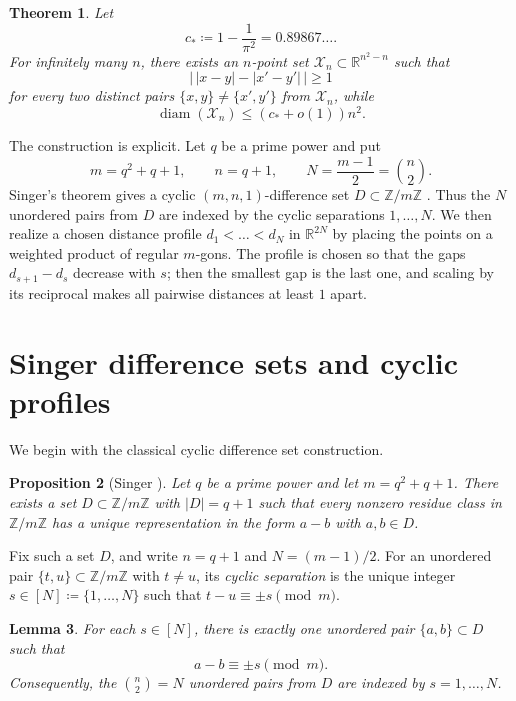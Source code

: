 \documentclass[twoside, reqno, 12pt]{amsart}
\newtheorem{theorem}{Theorem}
\newtheorem{proposition}[theorem]{Proposition}
\newtheorem{lemma}[theorem]{Lemma}
\theoremstyle{definition}
\theoremstyle{remark}
\DeclareMathOperator{\diam}{diam}
\begin{document}
\begin{theorem}\label{thm:main}
Let
\[
 c_*\coloneqq1-\frac{1}{\pi^2}=0.89867\dots.
\]
For infinitely many $n$, there exists an $n$-point set
$\mathcal X_n\subset \mathbb R^{n^2-n}$ such that
\begin{equation}\label{eq:sep-condition}
\bigl|\,|x-y|-|x'-y'|\,\bigr|\ge 1
\end{equation}
for every two distinct pairs
$\{x,y\}\neq \{x',y'\}$ from $\mathcal X_n$, while
\[
\diam(\mathcal X_n)\le (c_*+o(1))n^2.
\]
\end{theorem}

\newpage
The construction is explicit. Let $q$ be a prime power and put
\[
 m=q^2+q+1,
 \qquad n=q+1,
 \qquad N=\frac{m-1}{2}=\binom{n}{2}.
\]
Singer's theorem gives a cyclic $(m,n,1)$-difference set
$D\subset \mathbb Z/m\mathbb Z$ \cite{Singer1938}. Thus the $N$ unordered pairs from $D$
are indexed by the cyclic separations $1,\dots,N$. We then realize a chosen
distance profile $d_1<\dots<d_N$ in $\mathbb R^{2N}$ by placing the points on a
weighted product of regular $m$-gons. The profile is chosen so that the gaps
$d_{s+1}-d_s$ decrease with $s$; then the smallest gap is the last one, and
scaling by its reciprocal makes all pairwise distances at least $1$ apart.

\section{Singer difference sets and cyclic profiles}

We begin with the classical cyclic difference set construction.

\begin{proposition}[Singer \cite{Singer1938}]\label{prop:singer}
Let $q$ be a prime power and let $m=q^2+q+1$. There exists a set
$D\subset \mathbb Z/m\mathbb Z$ with $|D|=q+1$ such that every nonzero residue class in
$\mathbb Z/m\mathbb Z$ has a unique representation in the form $a-b$ with $a,b\in D$.
\end{proposition}

Fix such a set $D$, and write $n=q+1$ and $N=(m-1)/2$. For an unordered pair $\{t,u\}\subset \mathbb Z/m\mathbb Z$ with $t\neq u$, its
\emph{cyclic separation} is the unique integer $s\in[N]\coloneqq\{1,\dots,N\}$ such that
$t-u\equiv \pm s \pmod m$.

\begin{lemma}\label{lem:separations}
For each $s\in[N]$, there is exactly one unordered pair
$\{a,b\}\subset D$ such that
\[
a-b\equiv \pm s \pmod m.
\]
Consequently, the $\binom n2=N$ unordered pairs from $D$ are indexed by
$s=1,\dots,N$.
\end{lemma}
\end{document}
